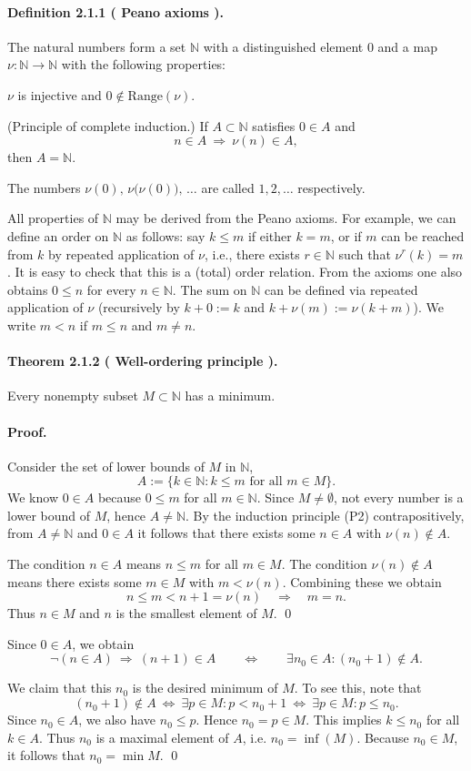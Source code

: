 \documentclass[12pt,a4paper]{article}
\newcommand{\N}{\mathbb{N}}
\newcommand{\NumberedDefinition}[3]{%
\paragraph*{Definition #1 ( #2 ).} #3\par}
\newcommand{\NumberedTheorem}[3]{%
\paragraph*{Theorem #1 ( #2 ).} #3\par}
\theoremstyle{plain}
\theoremstyle{definition}
\theoremstyle{remark}
\begin{document}
\NumberedDefinition{2.1.1}{Peano axioms}{The natural numbers form a set $\N$ with a distinguished element $0$ and a map $\nu: \N\to\N$ with the following properties:
\begin{description}[leftmargin=*]
	\item[P1)] $\nu$ is injective and $0\notin \mathrm{Range}(\nu)$.
	\item[P2)] (Principle of complete induction.) If $A\subset \N$ satisfies $0\in A$ and
	\[
		n\in A \ \Longrightarrow\ \nu(n)\in A,
	\]
	then $A=\N$.
\end{description}
The numbers $\nu(0),\,\nu\big(\nu(0)\big),\,\dots$ are called $1,2,\dots$ respectively.}

All properties of $\N$ may be derived from the Peano axioms. For example, we can define an order on $\N$ as follows: say
\emph{$k\le m$} if either $k=m$, or if $m$ can be reached from $k$ by repeated application of $\nu$, i.e., there exists $r\in\N$ such that $\nu^{r}(k)=m$.
It is easy to check that this is a (total) order relation. From the axioms one also obtains $0\le n$ for every $n\in\N$. The sum on $\N$ can be defined via repeated application of $\nu$ (recursively by $k+0:=k$ and $k+\nu(m):=\nu(k+m)$). We write $m<n$ if $m\le n$ and $m\ne n$.

\NumberedTheorem{2.1.2}{Well-ordering principle}{Every nonempty subset $M\subset \N$ has a minimum.}

\paragraph{Proof.} Consider the set of lower bounds of $M$ in $\N$,
\[
	A := \{ k\in \N : k\le m \text{ for all } m\in M\}.
\]
We know $0\in A$ because $0\le m$ for all $m\in\N$. Since $M\ne\emptyset$, not every number is a lower bound of $M$, hence $A\ne \N$. By the induction principle (P2) contrapositively, from $A\ne \N$ and $0\in A$ it follows that there exists some $n\in A$ with $\nu(n)\notin A$.

The condition $n\in A$ means $n\le m$ for all $m\in M$. The condition $\nu(n)\notin A$ means there exists some $m\in M$ with $m<\nu(n)$. Combining these we obtain
\[
	n\le m < n+1=\nu(n) \quad\Longrightarrow\quad m=n.
\]
Thus $n\in M$ and $n$ is the smallest element of $M$. \qed

Since $0\in A$, we obtain
\[
	\neg(n\in A) \ \Longrightarrow\ (n+1)\in A
	\qquad\Longleftrightarrow\qquad
	\exists n_0\in A : (n_0+1)\notin A.
\]

We claim that this $n_0$ is the desired minimum of $M$. To see this, note that
\[
	(n_0+1)\notin A \ \Longleftrightarrow\ \exists p\in M : p < n_0+1
	\ \Longleftrightarrow\ \exists p\in M : p\le n_0.
\]
Since $n_0\in A$, we also have $n_0\le p$. Hence $n_0=p\in M$. This implies $k\le n_0$ for all $k\in A$. Thus $n_0$ is a maximal element of $A$, i.e. $n_0=\inf(M)$. Because $n_0\in M$, it follows that $n_0=\min M$. \qed
\end{document}

